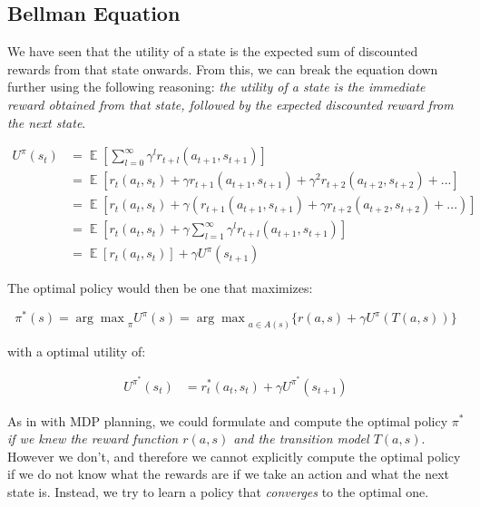\documentclass[12pt]{article}
\DeclareMathOperator{\E}{\mathbb{E}}
\begin{document}
\subsection{Bellman Equation}

We have seen that the utility of a state is the expected sum of discounted rewards from that state onwards. From this, we can break the equation down further using the following reasoning: \textit{the utility of a state is the immediate reward obtained from that state, followed by the expected discounted reward from the next state}.

\begin{equation*}
\begin{aligned}
U^{\pi}(s_t) &= \E[\sum^{\infty}_{l = 0} \gamma^l r_{t+l}(a_{t+1}, s_{t+1})] \\
&= \E[r_t(a_t, s_t) + \gamma r_{t+1}(a_{t+1}, s_{t+1}) + \gamma^2 r_{t+2}(a_{t+2}, s_{t+2})  + ...] \\
&= \E[r_t(a_t, s_t) + \gamma (r_{t+1}(a_{t+1}, s_{t+1}) + \gamma r_{t+2}(a_{t+2}, s_{t+2})  + ...)] \\
&= \E[r_t(a_t, s_t) + \gamma \sum^{\infty}_{l = 1} \gamma^l r_{t+l}(a_{t+1}, s_{t+1})] \\
&= \E[r_t(a_t, s_t)] + \gamma U^{\pi}(s_{t+1})
\end{aligned}
\end{equation*}

The optimal policy would then be one that maximizes:

\begin{equation*}
\pi^*(s) = {\arg \max}_{\pi} U^{\pi}(s) = {\arg \max}_{a \in A(s)} \{ r(a, s) + \gamma U^{\pi}(T(a, s))\} 
\end{equation*}

with a optimal utility of: 

\begin{equation*}
\begin{aligned}
U^{\pi^*}(s_t) &= r^*_t(a_t, s_t) + \gamma U^{\pi^*}(s_{t+1})
\end{aligned}
\end{equation*}

As in with MDP planning, we could formulate and compute the optimal policy $\pi^*$ \textit{if we knew the reward function $r(a, s)$ and the transition model $T(a, s)$}. However we don't, and therefore we cannot explicitly compute the optimal policy if we do not know what the rewards are if we take an action and what the next state is. Instead, we try to learn a policy that \textit{converges} to the optimal one.
\end{document}
